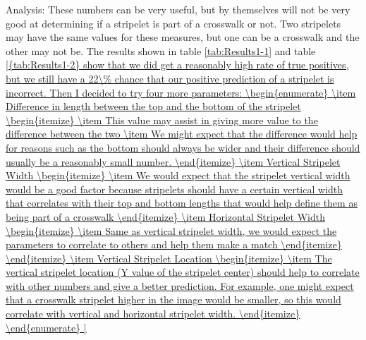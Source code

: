\documentclass[12pt]{ucthesis}
\begin{document}
Analysis: These numbers can be very useful, but by themselves will not be very good at determining if a stripelet is part of a crosswalk or not. Two stripelets may have the same values for these measures, but one can be a crosswalk and the other may not be. The results shown in table \ref{tab:Results1-1} and table \ref{{tab:Results1-2} show that we did get a reasonably high rate of true positives, but we still have a 22\% chance that our positive prediction of a stripelet is incorrect. 

Then I decided to try four more parameters:

\begin{enumerate}
   \item Difference in length between the top and the bottom of the stripelet
   \begin{itemize}
     \item This value may assist in giving more value to the difference between the two
     \item We might expect that the difference would help for reasons such as the bottom should always be wider and their difference should usually be a reasonably small number. 
   \end{itemize}
   \item Vertical Stripelet Width
   \begin{itemize}
     \item We would expect that the stripelet vertical width would be a good factor because stripelets should have a certain vertical width that correlates with their top and bottom lengths that would help define them as being part of a crosswalk
   \end{itemize}
      \item Horizontal Stripelet Width
   \begin{itemize}
     \item Same as vertical stripelet width, we would expect the parameters to correlate to others and help them make a match
   \end{itemize}
      \end{itemize}
      \item Vertical Stripelet Location
   \begin{itemize}
     \item The vertical stripelet location (Y value of the stripelet center) should help to correlate with other numbers and give a better prediction. For example, one might expect that a crosswalk stripelet higher in the image would be smaller, so this would correlate with vertical and horizontal stripelet width. 
   \end{itemize}
\end{enumerate}

}
\end{document}
